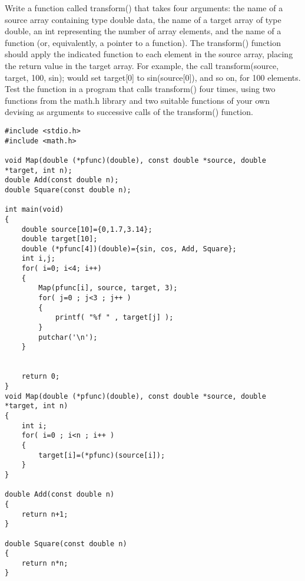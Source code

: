 \begin{question}
  Write a function called transform() that takes four arguments: the name of a source
  array containing type double data, the name of a target array of type double, an int
  representing the number of array elements, and the name of a function (or, equivalently,
  a pointer to a function). The transform() function should apply the indicated function
  to each element in the source array, placing the return value in the target array. For
  example, the call
  transform(source, target, 100, sin);
  would set target[0] to sin(source[0]), and so on, for 100 elements. Test the function
  in a program that calls transform() four times, using two functions from the math.h
  library and two suitable functions of your own devising as arguments to successive calls
  of the transform() function.
\end{question}
\begin{solution}
  \begin{verbatim}
#include <stdio.h>
#include <math.h>

void Map(double (*pfunc)(double), const double *source, double *target, int n);
double Add(const double n);
double Square(const double n);

int main(void)
{
	double source[10]={0,1.7,3.14};
	double target[10];
	double (*pfunc[4])(double)={sin, cos, Add, Square};
	int i,j;
	for( i=0; i<4; i++)
	{
		Map(pfunc[i], source, target, 3);
		for( j=0 ; j<3 ; j++ )
		{
			printf( "%f " , target[j] );
		}
		putchar('\n');
	}


	return 0;
}
void Map(double (*pfunc)(double), const double *source, double *target, int n)
{
	int i;
	for( i=0 ; i<n ; i++ )
	{
		target[i]=(*pfunc)(source[i]);
	}
}

double Add(const double n)
{
	return n+1;
}

double Square(const double n)
{
	return n*n;
}
  \end{verbatim}
\end{solution}


